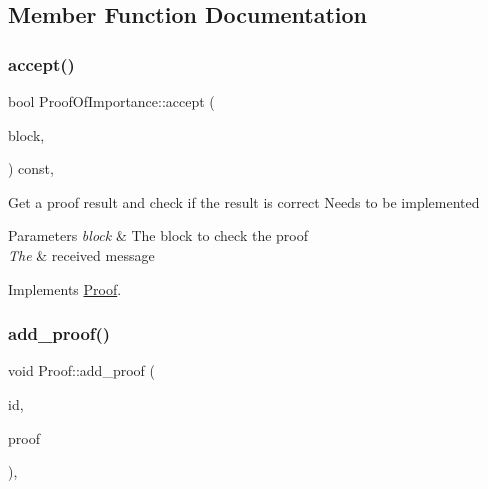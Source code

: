 \subsection{Member Function Documentation}
\mbox{\label{classProofOfImportance_a42a29f16c0c9e5e097fd734b7ee3fcf8}} 
\subsubsection{\texorpdfstring{accept()}{accept()}}
{\footnotesize\ttfamily bool Proof\+Of\+Importance\+::accept (\begin{DoxyParamCaption}\item[{\mbox{\hyperlink{classBlock}{Block}} $\ast$}]{block,  }\item[{\mbox{\hyperlink{classMessage}{Message}} $\ast$}]{ }\end{DoxyParamCaption}) const\hspace{0.3cm}{\ttfamily [override]}, {\ttfamily [virtual]}}

Get a proof result and check if the result is correct Needs to be implemented


\begin{DoxyParams}{Parameters}
{\em block} & The block to check the proof \\
\hline
{\em The} & received message \\
\hline
\end{DoxyParams}


Implements \mbox{\hyperlink{classProof_a358b3883eb33b8ecc93f74cb6313679a}{Proof}}.

\mbox{\label{classProof_a71874539fdbcc93c15594b889c95225b}} 
\subsubsection{\texorpdfstring{add\+\_\+proof()}{add\_proof()}}
{\footnotesize\ttfamily void Proof\+::add\+\_\+proof (\begin{DoxyParamCaption}\item[{int}]{id,  }\item[{std\+::function$<$ \mbox{\hyperlink{classProof}{Proof}} $\ast$()$>$}]{proof }\end{DoxyParamCaption})\hspace{0.3cm}{\ttfamily [static]}, {\ttfamily [inherited]}}

